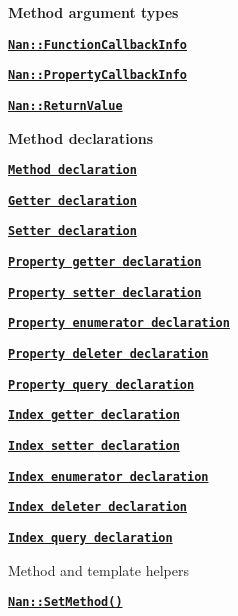 \begin{DoxyItemize}
\item {\bfseries Method argument types}
\begin{DoxyItemize}
\item \href{#api_nan_function_callback_info}{\tt {\bfseries {\ttfamily Nan\+::\+Function\+Callback\+Info}}}
\item \href{#api_nan_property_callback_info}{\tt {\bfseries {\ttfamily Nan\+::\+Property\+Callback\+Info}}}
\item \href{#api_nan_return_value}{\tt {\bfseries {\ttfamily Nan\+::\+Return\+Value}}}
\end{DoxyItemize}
\item {\bfseries Method declarations}
\begin{DoxyItemize}
\item \href{#api_nan_method}{\tt {\bfseries Method declaration}}
\item \href{#api_nan_getter}{\tt {\bfseries Getter declaration}}
\item \href{#api_nan_setter}{\tt {\bfseries Setter declaration}}
\item \href{#api_nan_property_getter}{\tt {\bfseries Property getter declaration}}
\item \href{#api_nan_property_setter}{\tt {\bfseries Property setter declaration}}
\item \href{#api_nan_property_enumerator}{\tt {\bfseries Property enumerator declaration}}
\item \href{#api_nan_property_deleter}{\tt {\bfseries Property deleter declaration}}
\item \href{#api_nan_property_query}{\tt {\bfseries Property query declaration}}
\item \href{#api_nan_index_getter}{\tt {\bfseries Index getter declaration}}
\item \href{#api_nan_index_setter}{\tt {\bfseries Index setter declaration}}
\item \href{#api_nan_index_enumerator}{\tt {\bfseries Index enumerator declaration}}
\item \href{#api_nan_index_deleter}{\tt {\bfseries Index deleter declaration}}
\item \href{#api_nan_index_query}{\tt {\bfseries Index query declaration}}
\end{DoxyItemize}
\item Method and template helpers
\begin{DoxyItemize}
\item \href{#api_nan_set_method}{\tt {\bfseries {\ttfamily Nan\+::\+Set\+Method()}}}

\end{DoxyItemize}
\end{DoxyItemize}
